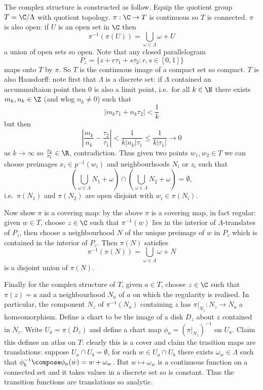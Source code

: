 \documentclass[a4paper]{article}
\begin{document}
The complex structure is constructed as follow. Equip the quotient group \(T = \C / \Lambda\) with quotient topology. \(\pi: \C \to T\) is continuous so \(T\) is connected. \(\pi\) is also open: if \(U\) is an open set in \(\C\) then
\[
    \pi^{-1}(\pi(U)) = \bigcup_{\omega \in \Lambda} \omega + U
  \]
  a union of open sets so open. Note that any closed parallelogram
  \[
    P_z = \{z + r \tau_1 + s \tau_2: r, s \in [0, 1]\}
  \]
  maps onto \(T\) by \(\pi\). So \(T\) is the continuous image of a compact set so compact. \(T\) is also Hausdorff: note first that \(\Lambda\) is a discrete set: if \(\Lambda\) contained an accummultaion point then \(0\) is also a limit point, i.e.\ for all \(k \in \N\) there exists \(m_k, n_k \in \Z\) (and wlog \(n_k \neq 0\)) such that
  \[
    |m_k \tau_1 + n_k \tau_2| < \frac{1}{k}
  \]
  but then
  \[
    \left| \frac{m_k}{n_k} - \frac{\tau_2}{\tau_1} \right|
    < \frac{1}{k|n_k|\tau_1}
    \leq \frac{1}{k|\tau_1|}
    \to 0
  \]
  as \(k \to \infty\) so \(\frac{\tau_2}{\tau_1} \in \R\), contradiction. Thus given two points \(w_1, w_2 \in T\) we can choose preimages \(x_i \in p^{-1}(w_i)\) and neighbourhoods \(N_i\) or \(z_i\) such that
  \[
    \left( \bigcup_{\omega \in \Lambda} N_1 + \omega \right) \cap \left( \bigcup_{\omega \in \Lambda} N_2 + \omega \right) = \emptyset,
  \]
  i.e.\ \(\pi(N_1)\) and \(\pi(N_2)\) are open disjoint with \(w_i \in \pi(N_i)\).

  Now show \(\pi\) is a covering map: by the above \(\pi\) is a covering map, in fact regular: given \(w \in T\), choose \(z \in \C\) such that \(\pi^{-1}(w)\) lies in the interior of \(\Lambda\)-translates of \(P_z\), then choose a neighbourhood \(N\) of the unique preimage of \(w\) in \(P_z\) which is contained in the interior of \(P_z\). Then \(\pi(N)\) satisfies
  \[
    \pi^{-1}(\pi(N)) = \bigcup_{\omega \in \Lambda} \omega + N
  \]
  is a disjoint union of \(\pi(N)\).

  Finally for the complex structure of \(T\), given \(a \in T\), choose \(z \in \C\) such that \(\pi(z) = a\) and a neighbourhood \(N_a\) of \(a\) on which the regularity is realised. In particular, the component \(N_z\) of \(\pi^{-1}(N_a)\) containing \(z\) has \(\pi|_{N_z}: N_z \to N_a\) a homeomorphism. Define a chart to be the image of a disk \(D_z\) about \(z\) contained in \(N_z\). Write \(U_a = \pi(D_z)\) and define a chart map \(\phi_a = (\pi|_{N_z})^{-1}\) on \(U_a\). Claim this defines an atlas on \(T\): clearly this is a cover and claim the trasition maps are translations: suppose \(U_a \cap U_b = \emptyset\), for each \(w \in U_a \cap U_b\) there exists \(\omega_w \in \Lambda\) such that \(\phi_b^{-1} \compose \phi_a(w) = w + \omega_w\). But \(w \mapsto \omega_w\) is a continuous function on a connected set and it takes values in a discrete set so is constant. Thus the transition functions are translations so analytic.
\end{document}
